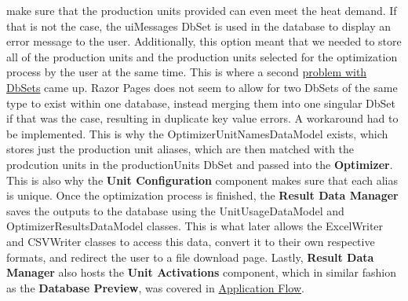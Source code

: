 \documentclass[12pt]{report}
\begin{document}
make sure that the production units provided can even meet the heat demand. If that is not the case, the uiMessages
DbSet is used in the database to display an error message to the user.
Additionally, this option meant that we needed to store all of the production units and the production units selected for 
the optimization process by the user at the same time. This is where a second \underline{problem with DbSets} came up.
Razor Pages does not seem to allow for two DbSets of the same type to exist within one database, instead
merging them into one singular DbSet if that was the case, resulting in duplicate key value errors. A workaround had to be implemented.
This is why the OptimizerUnitNamesDataModel exists, which stores just the production unit aliases, which are then matched
with the prodcution units in the productionUnits DbSet and passed into the \textbf{Optimizer}. This is also why the \textbf{Unit Configuration}
component makes sure that each alias is unique.
Once the optimization process is finished, the \textbf{Result Data Manager} saves the outputs to the database using
the UnitUsageDataModel and OptimizerResultsDataModel classes. This is what later allows the ExcelWriter and CSVWriter classes
to access this data, convert it to their own respective formats, and redirect the user to a file download page.
Lastly, \textbf{Result Data Manager} also hosts the \textbf{Unit Activations} component, which in similar fashion
as the \textbf{Database Preview}, was covered in \hyperref[sec:appflow]{Application Flow}.



\end{document}
